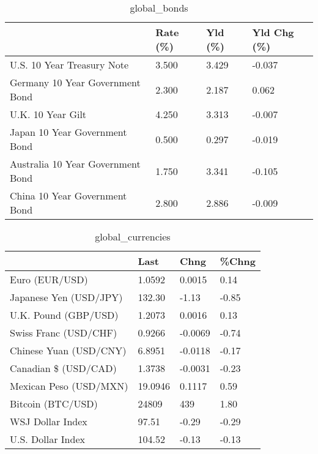 \documentclass{article}%
\begin{document}
%


\begin{table}[htbp]%
\caption{global\_bonds}%
\centering%
\begin{adjustbox}{width=1\textwidth}%
\begin{tabular}{llll}
\toprule
                                  & Rate (\%) & Yld (\%) & Yld Chg (\%) \\
\midrule
       U.S. 10 Year Treasury Note &    3.500 &   3.429 &      -0.037 \\
  Germany 10 Year Government Bond &    2.300 &   2.187 &       0.062 \\
                U.K. 10 Year Gilt &    4.250 &   3.313 &      -0.007 \\
    Japan 10 Year Government Bond &    0.500 &   0.297 &      -0.019 \\
Australia 10 Year Government Bond &    1.750 &   3.341 &      -0.105 \\
    China 10 Year Government Bond &    2.800 &   2.886 &      -0.009 \\
\bottomrule
\end{tabular}
%
\end{adjustbox}%
\end{table}

%


\begin{table}[htbp]%
\caption{global\_currencies}%
\centering%
\begin{adjustbox}{width=1\textwidth}%
\begin{tabular}{llll}
\toprule
                       &    Last &    Chng & \%Chng \\
\midrule
        Euro (EUR/USD) &  1.0592 &  0.0015 &  0.14 \\
Japanese Yen (USD/JPY) &  132.30 &   -1.13 & -0.85 \\
  U.K. Pound (GBP/USD) &  1.2073 &  0.0016 &  0.13 \\
 Swiss Franc (USD/CHF) &  0.9266 & -0.0069 & -0.74 \\
Chinese Yuan (USD/CNY) &  6.8951 & -0.0118 & -0.17 \\
  Canadian \$ (USD/CAD) &  1.3738 & -0.0031 & -0.23 \\
Mexican Peso (USD/MXN) & 19.0946 &  0.1117 &  0.59 \\
     Bitcoin (BTC/USD) &   24809 &     439 &  1.80 \\
      WSJ Dollar Index &   97.51 &   -0.29 & -0.29 \\
     U.S. Dollar Index &  104.52 &   -0.13 & -0.13 \\
\bottomrule
\end{tabular}
%
\end{adjustbox}%
\end{table}
\end{document}

